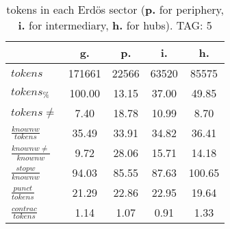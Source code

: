 \begin{table}[h!]
\begin{center}
\begin{tabular}{| l | c | c | c | c |}\hline
 & g. & p. & i. & h. \\\hline
$tokens$ & 171661  & 22566  & 63520  & 85575 \\\hline
$tokens_{\%}$ & 100.00  & 13.15  & 37.00  & 49.85 \\\hline
$tokens \neq$ & 7.40  & 18.78  & 10.99  & 8.70 \\\hline
$\frac{knownw}{tokens}$ & 35.49  & 33.91  & 34.82  & 36.41 \\\hline
$\frac{knownw \neq}{knownw}$ & 9.72  & 28.06  & 15.71  & 14.18 \\\hline
$\frac{stopw}{knownw}$ & 94.03  & 85.55  & 87.63  & 100.65 \\\hline
$\frac{punct}{tokens}$ & 21.29  & 22.86  & 22.95  & 19.64 \\\hline
$\frac{contrac}{tokens}$ & 1.14  & 1.07  & 0.91  & 1.33 \\\hline
\end{tabular}
\caption{tokens in each Erd\"os sector ({{\bf p.}} for periphery, {{\bf i.}} for intermediary, 
    {{\bf h.}} for hubs). TAG: 5}
\end{center}
\end{table}